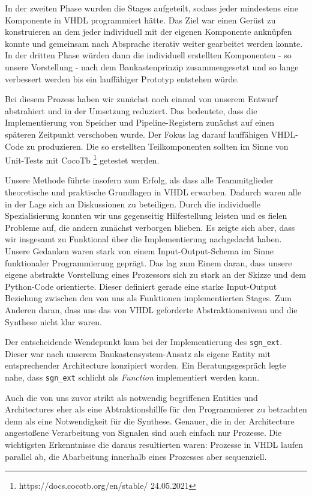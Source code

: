 \documentclass[paper=a4,fontsize=12pt,twocolumn]{scrreprt}
\begin{document}
In der zweiten Phase wurden die Stages aufgeteilt, sodass jeder mindestens eine Komponente in VHDL programmiert hätte.
Das Ziel war einen Gerüst zu konstruieren an dem jeder individuell mit der eigenen Komponente anknüpfen konnte und gemeinsam nach Absprache iterativ weiter gearbeitet werden konnte.
In der dritten Phase würden dann die individuell erstellten Komponenten - so unsere Vorstellung - nach dem Baukastenprinzip zusammengesetzt und so lange verbessert werden bis ein lauffähiger Prototyp entstehen würde.

Bei diesem Prozess haben wir zunächst noch einmal von unserem Entwurf abstrahiert und in der Umsetzung reduziert.
Das bedeutete, dass die Implementierung von Speicher und Pipeline-Registern zunächst auf einen späteren Zeitpunkt verschoben wurde.
Der Fokus lag darauf lauffähigen VHDL-Code zu produzieren.
Die so erstellten Teilkomponenten sollten im Sinne von Unit-Tests mit CocoTb \footnote{https://docs.cocotb.org/en/stable/ 24.05.2021} getestet werden.

Unsere Methode führte insofern zum Erfolg, als dass alle Teammitglieder theoretische und praktische Grundlagen in VHDL erwarben.
Dadurch waren alle in der Lage sich an Diskussionen zu beteiligen.
Durch die individuelle Spezialisierung konnten wir uns gegenseitig Hilfestellung leisten und es fielen Probleme auf, die andern zunächst verborgen blieben.
Es zeigte sich aber, dass wir insgesamt zu Funktional über die Implementierung nachgedacht haben. Unsere Gedanken waren stark von einem Input-Output-Schema im Sinne funktionaler Programmierung geprägt.
Das lag zum Einem daran, dass unsere eigene abstrakte Vorstellung eines Prozessors sich zu stark an der Skizze und dem Python-Code orientierte. Dieser definiert gerade eine starke Input-Output Beziehung zwischen den von uns als Funktionen implementierten Stages.
Zum Anderen daran, dass uns das von VHDL geforderte Abstraktionsniveau und die Synthese nicht klar waren.

Der entscheidende Wendepunkt kam bei der Implementierung des \texttt{sgn\_ext}.
Dieser war nach unserem Baukastensystem-Ansatz als eigene Entity mit entsprechender Architecture konzipiert worden.
Ein Beratungsgespräch legte nahe, dass \texttt{sgn\_ext} schlicht als \textit{Function} implementiert werden kann.

Auch die von uns zuvor strikt als notwendig begriffenen Entities und Architectures eher als eine Abtraktionshillfe für den Programmierer zu betrachten denn als eine Notwendigkeit für die Synthese.
Genauer, die in der Architecture angestoßene Verarbeitung von Signalen sind auch einfach nur Prozesse.
Die wichtigsten Erkenntnisse die daraus resultierten waren: Prozesse in VHDL laufen parallel ab, die Abarbeitung innerhalb eines Prozesses aber sequenziell.
\end{document}
